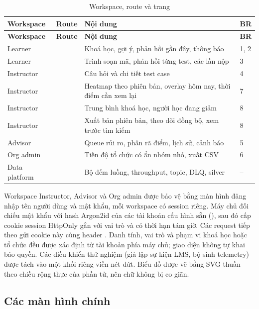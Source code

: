 {\small
\begin{longtable}{@{}L{2.4cm}L{4.4cm}L{6.4cm}L{1.4cm}@{}}
\caption{Workspace, route và trang}\label{tab:routes}\\
\toprule
\textbf{Workspace} & \textbf{Route} & \textbf{Nội dung} & \textbf{BR} \\
\midrule
\endfirsthead
\toprule
\textbf{Workspace} & \textbf{Route} & \textbf{Nội dung} & \textbf{BR} \\
\midrule
\endhead
Learner &  & Khoá học, gợi ý, phản hồi gần đây, thông báo & 1, 2 \\
Learner &  & Trình soạn mã, phản hồi từng test, các lần nộp & 3 \\
Instructor &  & Câu hỏi và chi tiết test case & 4 \\
Instructor &  & Heatmap theo phiên bản, overlay hôm nay, thời điểm cần xem lại & 7 \\
Instructor &  & Trung bình khoá học, người học đang giảm & 8 \\
Instructor &  & Xuất bản phiên bản, theo dõi đồng bộ, xem trước tìm kiếm & 8 \\
Advisor &  & Queue rủi ro, phân rã điểm, lịch sử, cảnh báo & 5 \\
Org admin &  & Tiến độ tổ chức có ẩn nhóm nhỏ, xuất CSV & 6 \\
Data platform &  & Bộ đếm luồng, throughput, topic, DLQ, silver & -- \\
\bottomrule
\end{longtable}}

Workspace Instructor, Advisor và Org admin được bảo vệ bằng màn hình đăng nhập tên người dùng và mật khẩu, mỗi workspace có session riêng. Máy chủ đối chiếu mật khẩu với hash Argon2id của các tài khoản cấu hình sẵn (), sau đó cấp cookie session HttpOnly gắn với vai trò và có thời hạn tám giờ. Các request tiếp theo gửi cookie này cùng header . Danh tính, vai trò và phạm vi khoá học hoặc tổ chức đều được xác định từ tài khoản phía máy chủ; giao diện không tự khai báo quyền. Các điều khiển thử nghiệm (giả lập sự kiện LMS, bộ sinh telemetry) được tách vào một khối riêng viền nét đứt. Biểu đồ được vẽ bằng SVG thuần theo chiều rộng thực của phần tử, nên chữ không bị co giãn.

\subsection{Các màn hình chính}

